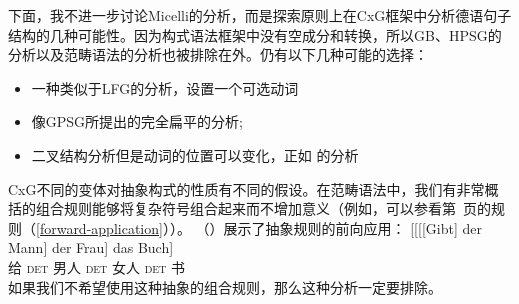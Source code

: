 下面，我不进一步讨论Micelli的分析，而是探索原则上在CxG框架中分析德语句子结构的几种可能性。因为构式语法框架中没有空成分和转换，所以GB、HPSG的分析以及范畴语法的分析也被排除在外。仍有以下几种可能的选择：
\begin{itemize}
\item 一种类似于LFG的分析，设置一个可选动词
\item 像GPSG所提出的完全扁平的分析;
\item 二叉结构分析但是动词的位置可以变化，正如 \citet[]{Steedman2000a-u}的分析
\end{itemize}
%
CxG不同的变体对抽象构式的性质有不同的假设。在范畴语法中，我们有非常概括的组合规则能够将复杂符号组合起来而不增加意义（例如，可以参看第~\pageref{forward-application}页的规则（\ref{forward-application}））。 （）展示了抽象规则的前向应用：
\ea
\gll {}[[[[Gibt] der Mann] der Frau] das Buch]\\
	 {}\spacebr{}\spacebr{}\spacebr{}\spacebr{}给 \textsc{det} 男人 \textsc{det} 女人 \textsc{det} 书\\
\z
如果我们不希望使用这种抽象的组合规则，那么这种分析一定要排除。

